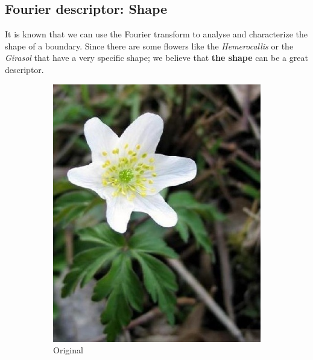 \documentclass[11]{article}
\begin{document}
\subsection{Fourier descriptor: Shape}
It is known that we can use the Fourier transform to analyse and characterize the shape of a boundary. Since there are some flowers like the \textit{Hemerocallis} or the \textit{Girasol} that have a very specific shape; we believe that \textbf{the shape} can be a great descriptor. 

\begin{figure}[H]
    \begin{subfigure}[t]{0.45\textwidth}
    \centering
  \includegraphics[scale=0.25]{images/originalfourier.jpg}
    \caption{Original}
    \label{originalfourier}
    \end{subfigure}
    \begin{subfigure}[t]{0.45\textwidth}
    \centering

\end{subfigure}
\end{figure}
\end{document}
